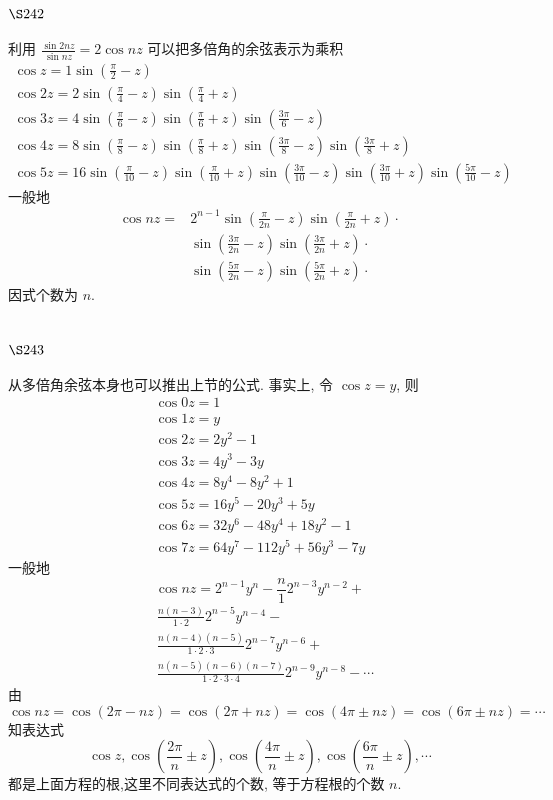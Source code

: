 \section{$\S 242$}

利用 $\frac{\sin 2 n z}{\sin n z}=2 \cos n z$ 可以把多倍角的余弦表示为乘积
\[
\begin{gathered}
\cos z=1 \sin \left(\frac{\pi}{2}-z\right) \\
\cos 2 z=2 \sin \left(\frac{\pi}{4}-z\right) \sin \left(\frac{\pi}{4}+z\right) \\
\cos 3 z=4 \sin \left(\frac{\pi}{6}-z\right) \sin \left(\frac{\pi}{6}+z\right) \sin \left(\frac{3 \pi}{6}-z\right) \\
\cos 4 z=8 \sin \left(\frac{\pi}{8}-z\right) \sin \left(\frac{\pi}{8}+z\right) \sin \left(\frac{3 \pi}{8}-z\right) \sin \left(\frac{3 \pi}{8}+z\right) \\
\cos 5 z=16 \sin \left(\frac{\pi}{10}-z\right) \sin \left(\frac{\pi}{10}+z\right) \sin \left(\frac{3 \pi}{10}-z\right) \sin \left(\frac{3 \pi}{10}+z\right) \sin \left(\frac{5 \pi}{10}-z\right)
\end{gathered}
\]
一般地
\[
\begin{aligned}
\cos n z= & 2^{n-1} \sin \left(\frac{\pi}{2 n}-z\right) \sin \left(\frac{\pi}{2 n}+z\right) \cdot \\
& \sin \left(\frac{3 \pi}{2 n}-z\right) \sin \left(\frac{3 \pi}{2 n}+z\right) \cdot \\
& \sin \left(\frac{5 \pi}{2 n}-z\right) \sin \left(\frac{5 \pi}{2 n}+z\right) \cdot
\end{aligned}
\]
因式个数为 $n$.

\section{$\S 243$}

从多倍角余弦本身也可以推出上节的公式. 事实上, 令 $\cos z=y$, 则
\[
\begin{gathered}
\cos 0 z=1 \\
\cos 1 z=y \\
\cos 2 z=2 y^{2}-1 \\
\cos 3 z=4 y^{3}-3 y \\
\cos 4 z=8 y^{4}-8 y^{2}+1 \\
\cos 5 z=16 y^{5}-20 y^{3}+5 y \\
\cos 6 z=32 y^{6}-48 y^{4}+18 y^{2}-1 \\
\cos 7 z=64 y^{7}-112 y^{5}+56 y^{3}-7 y
\end{gathered}
\]
一般地
\[
\cos n z=2^{n-1} y^{n}-\frac{n}{1} 2^{n-3} y^{n-2}+
\]
\[
\begin{aligned}
& \frac{n(n-3)}{1 \cdot 2} 2^{n-5} y^{n-4}- \\
& \frac{n(n-4)(n-5)}{1 \cdot 2 \cdot 3} 2^{n-7} y^{n-6}+ \\
& \frac{n(n-5)(n-6)(n-7)}{1 \cdot 2 \cdot 3 \cdot 4} 2^{n-9} y^{n-8}-\cdots
\end{aligned}
\]
由
\[
\cos n z=\cos (2 \pi-n z)=\cos (2 \pi+n z)=\cos (4 \pi \pm n z)=\cos (6 \pi \pm n z)=\cdots
\]
知表达式
\[
\cos z, \cos \left(\frac{2 \pi}{n} \pm z\right), \cos \left(\frac{4 \pi}{n} \pm z\right), \cos \left(\frac{6 \pi}{n} \pm z\right), \cdots
\]
都是上面方程的根,这里不同表达式的个数, 等于方程根的个数 $n$.

